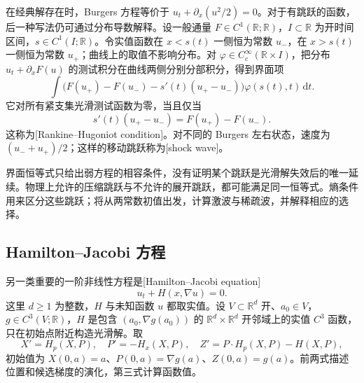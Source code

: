 在经典解存在时，Burgers 方程等价于
\(u_t+\partial_x(u^2/2)=0\)。对于有跳跃的函数，后一种写法仍可通过分布导数解释。设一般通量 \(F\in C^1(\mathbb R;\mathbb R)\)，\(I\subset\mathbb R\) 为开时间区间，\(s\in C^1(I;\mathbb R)\)。令实值函数在 \(x<s(t)\) 一侧恒为常数 \(u_-\)，在 \(x>s(t)\) 一侧恒为常数 \(u_+\)；曲线上的取值不影响分布。对 \(\varphi\in C_c^\infty(\mathbb R\times I)\)，把分布 \(u_t+\partial_xF(u)\) 的测试积分在曲线两侧分别分部积分，得到界面项
\[
 \int \bigl(F(u_+)-F(u_-)-s'(t)(u_+-u_-)\bigr)
 \varphi(s(t),t)\,\mathrm dt.
\]
它对所有紧支集光滑测试函数为零，当且仅当
\[
 s'(t)(u_+-u_-)=F(u_+)-F(u_-).
\]
这称为[Rankine--Hugoniot condition]。对不同的 Burgers 左右状态，速度为 \((u_-+u_+)/2\)；这样的移动跳跃称为[shock wave]。

\ProseParagraphBreak

界面恒等式只给出弱方程的相容条件，没有证明某个跳跃是光滑解失效后的唯一延续。物理上允许的压缩跳跃与不允许的展开跳跃，都可能满足同一恒等式。熵条件用来区分这些跳跃；将从两常数初值出发，计算激波与稀疏波，并解释相应的选择。

\subsection{Hamilton--Jacobi 方程}
\label{b2:subsec:070404}

另一类重要的一阶非线性方程是[Hamilton--Jacobi equation]
\[
 u_t+H(x,\nabla u)=0.
\]
这里 \(d\geq1\) 为整数，\(H\) 与未知函数 \(u\) 都取实值。设 \(V\subset\mathbb R^d\) 开、\(a_0\in V\)，\(g\in C^3(V;\mathbb R)\)，\(H\) 是包含 \((a_0,\nabla g(a_0))\) 的 \(\mathbb R^d\times\mathbb R^d\) 开邻域上的实值 \(C^3\) 函数，只在初始点附近构造光滑解。取
\begin{equation}\label{b2:eq:07-hamilton-system}
 X'=H_p(X,P),\quad P'=-H_x(X,P),\quad
 Z'=P\cdot H_p(X,P)-H(X,P),
\end{equation}
初始值为 \(X(0,a)=a\)、\(P(0,a)=\nabla g(a)\)、\(Z(0,a)=g(a)\)。前两式描述位置和候选梯度的演化，第三式计算函数值。

